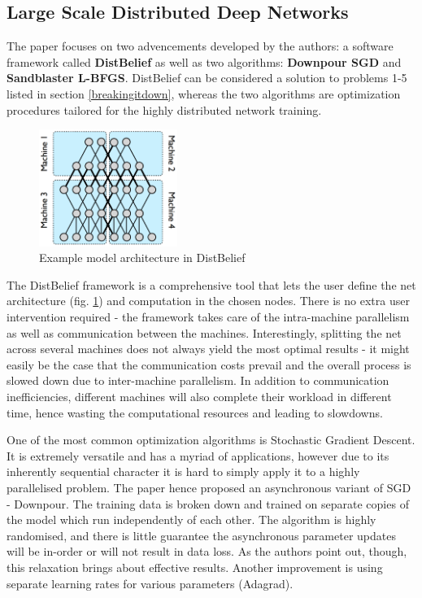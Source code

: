 \documentclass[a4paper, 11pt]{article}
\numberwithin{equation}{section}
\begin{document}
	\subsection{Large Scale Distributed Deep Networks}
	
	The paper focuses on two advencements developed by the authors: a software framework called \textbf{DistBelief} as well as two algorithms: \textbf{Downpour SGD} and \textbf{Sandblaster L-BFGS}. DistBelief can be considered a solution to problems 1-5 listed in section \ref{breakingitdown}, whereas the two algorithms are optimization procedures tailored for the highly distributed network training.
	
	\begin{figure}[H]
		\centering
		\includegraphics[width=0.40\textwidth]{distbelief.png}
		\caption{\label{fig:distbelief}Example model architecture in DistBelief \cite{dean2012large}}
	\end{figure}
	
	The DistBelief framework is a comprehensive tool that lets the user define the net architecture (fig. \ref{fig:distbelief}) and computation in the chosen nodes. There is no extra user intervention required - the framework takes care of the intra-machine parallelism as well as communication between the machines. Interestingly, splitting the net across several machines does not always yield the most optimal results - it might easily be the case that the communication costs prevail and the overall process is slowed down due to inter-machine parallelism. In addition to communication inefficiencies, different machines will also complete their workload in different time, hence wasting the computational resources and leading to slowdowns.
	
	One of the most common optimization algorithms is Stochastic Gradient Descent. It is extremely versatile and has a myriad of applications, however due to its inherently sequential character it is hard to simply apply it to a highly parallelised problem. The paper hence proposed an asynchronous variant of SGD - Downpour. The training data is broken down and trained on separate copies of the model which run independently of each other. The algorithm is highly randomised, and there is little guarantee the asynchronous parameter updates will be in-order or will not result in data loss. As the authors point out, though, this relaxation brings about effective results. Another improvement is using separate learning rates for various parameters (Adagrad).
	
\end{document}
